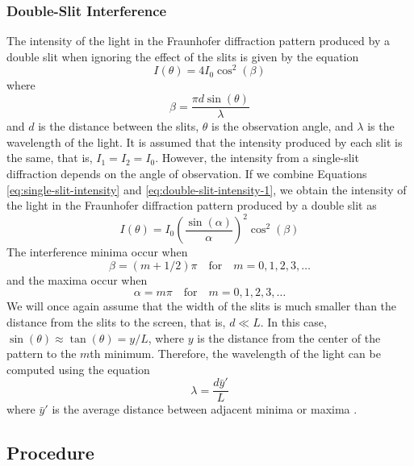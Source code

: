 \documentclass[10pt]{article}
\begin{document}
\subsubsection*{Double-Slit Interference}

The intensity of the light in the Fraunhofer diffraction pattern produced by a double slit when ignoring the effect of the slits is given by the equation
\begin{equation}
  I(\theta) = 4 I_0 \cos^2(\beta)
  \label{eq:double-slit-intensity-1}
\end{equation}
where
\begin{equation}
  \beta = \frac{\pi d \sin(\theta)}{\lambda}
\end{equation}
and $d$ is the distance between the slits, $\theta$ is the observation angle, and $\lambda$ is the wavelength of the light. It is assumed that the intensity produced by each slit is the same, that is, $I_1 = I_2 = I_0$. However, the intensity from a single-slit diffraction depends on the angle of observation. If we combine Equations \eqref{eq:single-slit-intensity} and \eqref{eq:double-slit-intensity-1}, we obtain the intensity of the light in the Fraunhofer diffraction pattern produced by a double slit as
\begin{equation}
  I(\theta) = I_0 \left( \frac{\sin(\alpha)}{\alpha} \right)^2 \cos^2(\beta)
  \label{eq:double-slit-intensity-2}
\end{equation}
The interference minima occur when
\begin{equation}
  \beta = (m + 1/2) \pi \quad \text{for} \quad m = 0, 1, 2, 3, \ldots
\end{equation}
and the maxima occur when
\begin{equation}
  \alpha = m \pi \quad \text{for} \quad m = 0, 1, 2, 3, \ldots
\end{equation}  
We will once again assume that the width of the slits is much smaller than the distance from the slits to the screen, that is, $d \ll L$. In this case, $\sin(\theta) \approx \tan(\theta) = y/L$, where $y$ is the distance from the center of the pattern to the $m$th minimum. Therefore, the wavelength of the light can be computed using the equation
\begin{equation}
  \lambda = \frac{d \bar{y}'}{L}
\end{equation}
where $\bar{y}'$ is the average distance between adjacent minima or maxima \cite{Pedrotti_2006}.

\subsection*{Procedure} 
\end{document}
